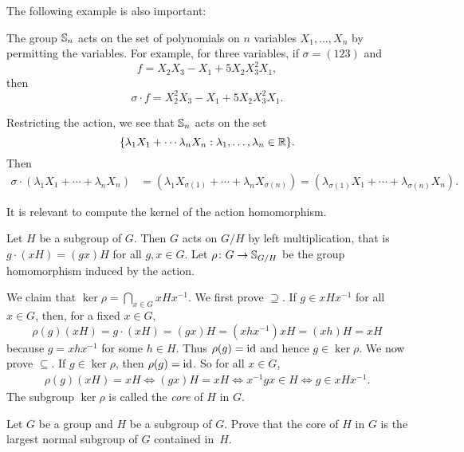 The following example is also important: 

\begin{optional}
\begin{example}
    The group $\mathbb{S}_n$ acts on the set of polynomials on
    $n$ variables $X_1,\dots,X_n$
    by permitting the variables. For example, for three variables, if 
    $\sigma=(123)$ and 
    \[
    f=X_2X_3-X_1+5X_2X_3^2X_1,
    \]
    then 
    \[
    \sigma\cdot f=X_2^2X_3-X_1+5X_2X_3^2X_1.
    \]

    Restricting the action, we see that 
    $\mathbb{S}_n$ acts on the set 
    \[
    \{\lambda_1X_1+\cdots\lambda_nX_n:\lambda_1,\dots,\lambda_n\in\mathbb{R}\}.
    \]
    Then 
    \begin{align*}
    \sigma \cdot (\lambda_1X_1+\cdots+\lambda_nX_n) &= (\lambda_1X_{\sigma(1)}+\cdots+\lambda_nX_{\sigma(n)})
    =(\lambda_{\sigma(1)}X_1+\cdots+\lambda_{\sigma(n)}X_n).
    \end{align*}
\end{example}
\end{optional}


It is relevant to compute the kernel of the action homomorphism. 

\begin{example}
Let $H$ be a subgroup of $G$. Then $G$ 
acts on $G/H$ by left multiplication, that is 
$g\cdot (xH)=(gx)H$ for all $g,x\in G$. Let $\rho\colon G\to\mathbb{S}_{G/H}$ be the group homomorphism induced by the action. 

We claim that $\ker\rho=\bigcap_{x\in G}xHx^{-1}$. 
We first prove $\supseteq$. If $g\in xHx^{-1}$ for all 
$x\in G$, then, for a fixed $x\in G$,
 \[
 \rho(g)(xH)=g\cdot (xH)=(gx)H=(xhx^{-1})xH=(xh)H=xH
 \]
because $g=xhx^{-1}$ for some $h\in H$. Thus $\rho(g)=\operatorname{id}$ 
and hence $g\in\ker\rho$. We now prove 
$\subseteq$. If $g\in\ker\rho$, then
 $\rho(g)=\operatorname{id}$. So for all $x\in G$,
 \begin{align*}
\rho(g)(xH)=xH
\Longleftrightarrow (gx)H=xH
\Longleftrightarrow x^{-1}gx\in H
\Longleftrightarrow g\in xHx^{-1}.
 \end{align*}
The subgroup $\ker\rho$ is called the \emph{core} of $H$ in $G$. 
\end{example}

\begin{exercise}
    Let $G$ be a group and $H$ be a subgroup of $G$. Prove that
    the core 
    of $H$ in $G$ is the largest normal subgroup of $G$ 
    contained in~$H$.
\end{exercise}

